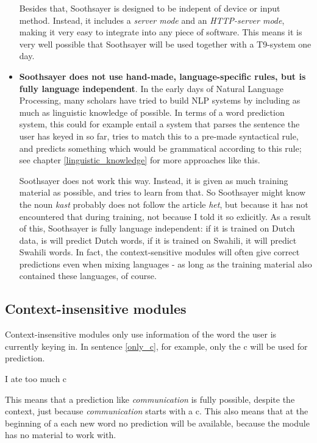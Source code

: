\documentclass[12pt]{article}
\begin{document}
\begin{itemize}
Besides that, Soothsayer is designed to be indepent of device or input method. Instead, it includes a \emph{server mode} and an \emph{HTTP-server mode}, making it very easy to integrate into any piece of software. This means it is very well possible that Soothsayer will be used together with a T9-system one day.

\item \textbf{Soothsayer does not use hand-made, language-specific rules, but is fully language independent}. In the early days of Natural Language Processing, many scholars have tried to build NLP systems by including as much as linguistic knowledge of possible. In terms of a word prediction system, this could for example entail a system that parses the sentence the user has keyed in so far, tries to match this to a pre-made syntactical rule, and predicts something which would be grammatical according to this rule; see chapter \ref{linguistic_knowledge} for more approaches like this.

Soothsayer does not work this way. Instead, it is given as much training material as possible, and tries to learn from that. So Soothsayer might know the noun \emph{kast} probably does not follow the article \emph{het}, but because it has not encountered that during training, not because I told it so exlicitly. As a result of this, Soothsayer is fully language independent: if it is trained on Dutch data, is will predict Dutch words, if it is trained on Swahili, it will predict Swahili words. In fact, the context-sensitive modules will often give correct predictions even when mixing languages - as long as the training material also contained these languages, of course.

\end{itemize}

\subsection{Context-insensitive modules} \label{ci}

Context-insensitive modules only use information of the word the user is currently keying in. In sentence \ref{only_c}, for example, only the c will be used for prediction. 

\begin{examples}
\item I ate too much c \label{only_c}
\end{examples}

This means that a prediction like \emph{communication} is fully possible, despite the context, just because \emph{communication} starts with a c. This also means that at the beginning of a each new word no prediction will be available, because the module has no material to work with.
\end{document}
